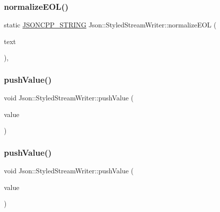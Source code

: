 \subsubsection{\texorpdfstring{normalize\+E\+O\+L()}{normalizeEOL()}\hspace{0.1cm}{\footnotesize\ttfamily [2/2]}}
{\footnotesize\ttfamily static \hyperlink{config_8h_a1e723f95759de062585bc4a8fd3fa4be}{J\+S\+O\+N\+C\+P\+P\+\_\+\+S\+T\+R\+I\+NG} Json\+::\+Styled\+Stream\+Writer\+::normalize\+E\+OL (\begin{DoxyParamCaption}\item[{const \hyperlink{config_8h_a1e723f95759de062585bc4a8fd3fa4be}{J\+S\+O\+N\+C\+P\+P\+\_\+\+S\+T\+R\+I\+NG} \&}]{text }\end{DoxyParamCaption})\hspace{0.3cm}{\ttfamily [static]}, {\ttfamily [private]}}

\hypertarget{class_json_1_1_styled_stream_writer_a9adb47185695f07b1979d8f4c5347592}{}\label{class_json_1_1_styled_stream_writer_a9adb47185695f07b1979d8f4c5347592} 
\subsubsection{\texorpdfstring{push\+Value()}{pushValue()}\hspace{0.1cm}{\footnotesize\ttfamily [1/2]}}
{\footnotesize\ttfamily void Json\+::\+Styled\+Stream\+Writer\+::push\+Value (\begin{DoxyParamCaption}\item[{const \hyperlink{config_8h_a1e723f95759de062585bc4a8fd3fa4be}{J\+S\+O\+N\+C\+P\+P\+\_\+\+S\+T\+R\+I\+NG} \&}]{value }\end{DoxyParamCaption})\hspace{0.3cm}{\ttfamily [private]}}

\hypertarget{class_json_1_1_styled_stream_writer_a9adb47185695f07b1979d8f4c5347592}{}\label{class_json_1_1_styled_stream_writer_a9adb47185695f07b1979d8f4c5347592} 
\subsubsection{\texorpdfstring{push\+Value()}{pushValue()}\hspace{0.1cm}{\footnotesize\ttfamily [2/2]}}
{\footnotesize\ttfamily void Json\+::\+Styled\+Stream\+Writer\+::push\+Value (\begin{DoxyParamCaption}\item[{const \hyperlink{config_8h_a1e723f95759de062585bc4a8fd3fa4be}{J\+S\+O\+N\+C\+P\+P\+\_\+\+S\+T\+R\+I\+NG} \&}]{value }\end{DoxyParamCaption})\hspace{0.3cm}{\ttfamily [private]}}



